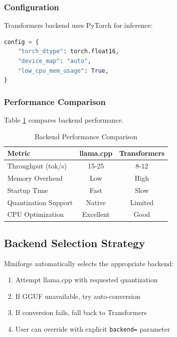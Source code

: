 \subsubsection{Configuration}

Transformers backend uses PyTorch for inference:

\begin{lstlisting}[language=Python, caption=Transformers Configuration]
config = {
    "torch_dtype": torch.float16,
    "device_map": "auto",
    "low_cpu_mem_usage": True,
}
\end{lstlisting}

\subsubsection{Performance Comparison}

Table \ref{tab:backend_comparison} compares backend performance.

\begin{table}[h]
\centering
\caption{Backend Performance Comparison}
\label{tab:backend_comparison}
\begin{tabular}{lcc}
\toprule
\textbf{Metric} & \textbf{llama.cpp} & \textbf{Transformers} \\
\midrule
Throughput (tok/s) & 15-25 & 8-12 \\
Memory Overhead & Low & High \\
Startup Time & Fast & Slow \\
Quantization Support & Native & Limited \\
CPU Optimization & Excellent & Good \\
\bottomrule
\end{tabular}
\end{table}

\subsection{Backend Selection Strategy}

Miniforge automatically selects the appropriate backend:

\begin{enumerate}
    \item Attempt llama.cpp with requested quantization
    \item If GGUF unavailable, try auto-conversion
    \item If conversion fails, fall back to Transformers
    \item User can override with explicit \texttt{backend=} parameter
\end{enumerate}

